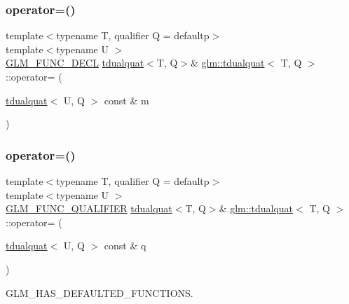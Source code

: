 \subsubsection{\texorpdfstring{operator=()}{operator=()}\hspace{0.1cm}{\footnotesize\ttfamily [2/3]}}
{\footnotesize\ttfamily template$<$typename T, qualifier Q = defaultp$>$ \\
template$<$typename U $>$ \\
\mbox{\hyperlink{setup_8hpp_ab2d052de21a70539923e9bcbf6e83a51}{G\+L\+M\+\_\+\+F\+U\+N\+C\+\_\+\+D\+E\+CL}} \mbox{\hyperlink{structglm_1_1tdualquat}{tdualquat}}$<$T, Q$>$\& \mbox{\hyperlink{structglm_1_1tdualquat}{glm\+::tdualquat}}$<$ T, Q $>$\+::operator= (\begin{DoxyParamCaption}\item[{\mbox{\hyperlink{structglm_1_1tdualquat}{tdualquat}}$<$ U, Q $>$ const \&}]{m }\end{DoxyParamCaption})}

\mbox{\label{structglm_1_1tdualquat_a6bdd31159c6bf9d7bca75971c2a1e512}} 
\subsubsection{\texorpdfstring{operator=()}{operator=()}\hspace{0.1cm}{\footnotesize\ttfamily [3/3]}}
{\footnotesize\ttfamily template$<$typename T, qualifier Q = defaultp$>$ \\
template$<$typename U $>$ \\
\mbox{\hyperlink{setup_8hpp_a33fdea6f91c5f834105f7415e2a64407}{G\+L\+M\+\_\+\+F\+U\+N\+C\+\_\+\+Q\+U\+A\+L\+I\+F\+I\+ER}} \mbox{\hyperlink{structglm_1_1tdualquat}{tdualquat}}$<$T, Q$>$\& \mbox{\hyperlink{structglm_1_1tdualquat}{glm\+::tdualquat}}$<$ T, Q $>$\+::operator= (\begin{DoxyParamCaption}\item[{\mbox{\hyperlink{structglm_1_1tdualquat}{tdualquat}}$<$ U, Q $>$ const \&}]{q }\end{DoxyParamCaption})}



G\+L\+M\+\_\+\+H\+A\+S\+\_\+\+D\+E\+F\+A\+U\+L\+T\+E\+D\+\_\+\+F\+U\+N\+C\+T\+I\+O\+NS. 

\mbox{\label{structglm_1_1tdualquat_a23ea50ee4bf311b8d37155ebec56dd90}} 
